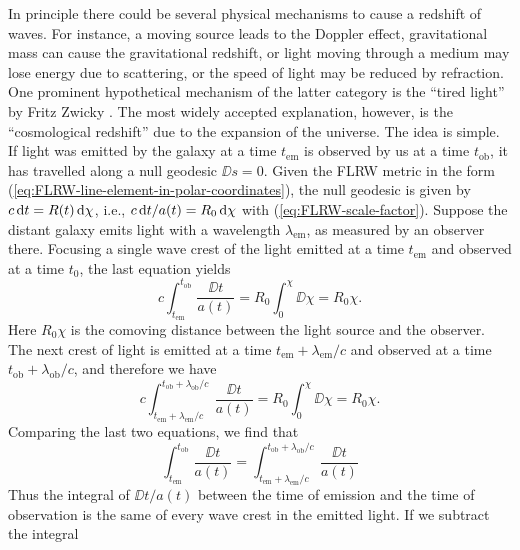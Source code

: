 In principle there could be several physical mechanisms to cause a redshift of waves. For instance, a moving source leads to the Doppler effect, gravitational mass can cause the gravitational redshift, or light moving through a medium may lose energy due to scattering, or the speed of light may be reduced by refraction. One prominent hypothetical mechanism of the latter category is the “tired light” by Fritz Zwicky \cite{Zwicky-1929}.
%
The most widely accepted explanation, however, is the “cosmological redshift” due to the expansion of the universe. The idea is simple. \cite[46]{Ryden-2017} If light was emitted by the galaxy at a time $t_{\mathrm{em}}$ is observed by us at a time $t_{\mathrm{ob}}$, it has travelled along a null geodesic $\DD s = 0$. Given the FLRW metric in the form (\ref{eq:FLRW-line-element-in-polar-coordinates}), %
the null geodesic is given by $c \,\mathrm{d} t = R(t) \,\mathrm{d} \chi$, i.e., $c \,\mathrm{d} t / a(t) = R_0 \,\mathrm{d} \chi$ with (\ref{eq:FLRW-scale-factor}).
Suppose the distant galaxy emits light with a wavelength $\lambda_{\mathrm{em}}$, as measured by an observer there. Focusing a single wave crest of the light emitted at a time $t_{\mathrm{em}}$ and observed at a time $t_0$, the last equation yields
\begin{equation}
	c \int_{t_{\mathrm{em}}}^{t_{\mathrm{ob}}} \frac{\DD t}{a(t)}
	= R_0 \int_0^\chi \DD \chi
	= R_0 \chi.
\end{equation}
Here $R_0\chi$ is the comoving distance between the light source and the observer. \cite[31]{Dodelson-Schmidt-2025}
The next crest of light is emitted at a time $t_{\mathrm{em}} + \lambda_{\mathrm{em}}/c$ and observed at a time $t_{\mathrm{ob}} + \lambda_{\mathrm{ob}}/c$, and therefore we have
\begin{equation}
	c \int_{t_{\mathrm{em}} + \lambda_{\mathrm{em}}/c}^{t_{\mathrm{ob}} + \lambda_{\mathrm{ob}}/c} \frac{\DD t}{a(t)}
	= R_0 \int_0^\chi \DD \chi
	= R_0 \chi.
\end{equation}
Comparing the last two equations, we find that
\begin{equation}
	\int_{t_{\mathrm{em}}}^{t_{\mathrm{ob}}} \frac{\DD t}{a(t)}
	=
	\int_{t_{\mathrm{em}} + \lambda_{\mathrm{em}}/c}^{t_{\mathrm{ob}} + \lambda_{\mathrm{ob}}/c} \frac{\DD t}{a(t)}
\end{equation}
Thus the integral of $\DD t/a(t)$ between the time of emission and the time of observation is the same of every wave crest in the emitted light. If we subtract the integral
